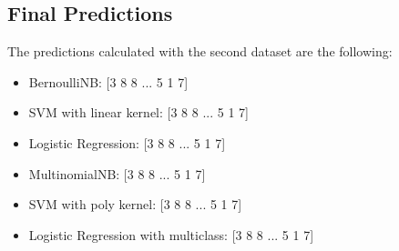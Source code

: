 \documentclass{article}
\begin{document}
\begin{titlepage}
  \newpage

  \section{Final Predictions}
  The predictions calculated with the second dataset are the following:

  \begin{itemize}
    \item BernoulliNB: [3 8 8 ... 5 1 7]
    \item SVM with linear kernel: [3 8 8 ... 5 1 7]
    \item Logistic Regression: [3 8 8 ... 5 1 7]
    \item MultinomialNB: [3 8 8 ... 5 1 7]
    \item SVM with poly kernel: [3 8 8 ... 5 1 7]
    \item Logistic Regression with multiclass: [3 8 8 ... 5 1 7]
  \end{itemize}

\end{titlepage}
\end{document}
